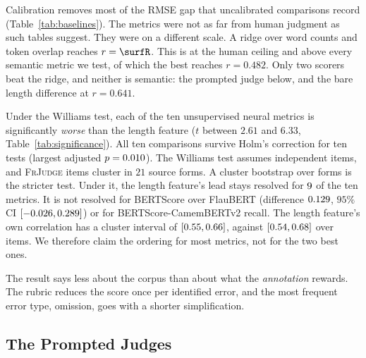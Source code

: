\documentclass{BVP_JCLLT}
\newcommand{\rev}[1]{#1}
\newcommand{\rev}[1]{{\color{revcol}#1}}
\begin{document}
\rev{Calibration removes most of the RMSE gap that uncalibrated comparisons
record (Table~\ref{tab:baselines}). The metrics were not as far from human
judgment as such tables suggest. They were on a different scale. A ridge over
word counts and token overlap reaches $r=\surfR$. This is at the human ceiling
and above every semantic metric we test, of which the best reaches $r=0.482$.
Only two scorers beat the ridge, and neither is semantic: the prompted judge
below, and the bare length difference at $r=0.641$.

Under the Williams test, each of the ten unsupervised neural metrics is
significantly \emph{worse} than the length feature ($t$ between $2.61$ and
$6.33$, Table~\ref{tab:significance}). All ten
comparisons survive Holm's correction for ten tests (largest adjusted $p =
0.010$). The Williams test assumes independent items, and \textsc{FrJudge}
items cluster in $21$ source forms. A cluster bootstrap over forms is the
stricter test. Under it, the length feature's lead stays resolved for
$9$ of the ten metrics. It is not resolved for BERTScore over
FlauBERT (difference $0.129$, $95\%$ CI $[-0.026,
0.289]$) or for BERTScore-CamemBERTv2 recall. The length feature's own
correlation has a cluster interval of $[0.55, 0.66]$, against
$[0.54, 0.68]$ over items. We therefore claim the ordering for most
metrics, not for the two best ones.

The result says less about the corpus than about what the \emph{annotation}
rewards. The rubric reduces the score once per identified error, and the most
frequent error type, omission, goes with a shorter simplification.}

\begin{table}
\centering
\caption{Williams tests against the trivial length baseline
$\ell = -|\,|s|-|o|\,|$. \rev{Over all $297$ items, $\ell$ reaches $r=0.613$
with the human label $h$.} $r(m,\ell)$ is each metric's correlation with the length
feature itself, the dependence the test corrects for. Positive $t$ favours
$\ell$. \rev{$p_{\text{Holm}}$ is adjusted for the ten tests. The last column is
the $95\%$ cluster-bootstrap interval, over the $21$ source forms, for
$r(\ell,h)-r(m,h)$.}}\label{tab:significance}
\footnotesize
\rev{\resizebox{\columnwidth}{!}{}}
\end{table}

\subsection{The Prompted Judges}\label{sec:judge}
\end{document}
